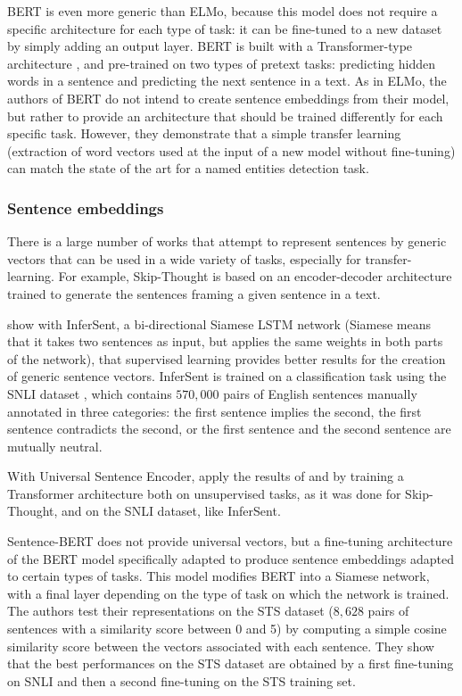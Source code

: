 BERT \cite{devlin2018bert} is even more generic than ELMo, because this model does not require a specific architecture for each type of task: it can be fine-tuned to a new dataset by simply adding an output layer. BERT is built with a Transformer-type architecture \cite{vaswani2017attention}, and pre-trained on two types of pretext tasks: predicting hidden words in a sentence and predicting the next sentence in a text. As in ELMo, the authors of BERT do not intend to create sentence embeddings from their model, but rather to provide an architecture that should be trained differently for each specific task. However, they demonstrate that a simple transfer learning (extraction of  word vectors used at the input of a new model without fine-tuning) can match the state of the art for a named entities detection task.

\subsubsection{Sentence embeddings}
\label{embedding_phrases}
There is a large number of works that attempt to represent sentences by generic vectors that can be used in a wide variety of tasks, especially for transfer-learning. 
For example, Skip-Thought \citep{kiros2015skip} is based on an encoder-decoder architecture trained to generate the sentences framing a given sentence in a text.

\citet{conneau2017supervised} show with InferSent, a bi-directional Siamese LSTM network (Siamese means that it takes two sentences as input, but applies the same weights in both parts of the network), that supervised learning provides better results for the creation of generic sentence vectors. InferSent is trained on a classification task using the SNLI dataset \cite{bowman2015large}, which contains $570,000$ pairs of English sentences manually annotated in three categories: the first sentence implies the second, the first sentence contradicts the second, or the first sentence and the second sentence are mutually neutral.

With Universal Sentence Encoder, \citet{cer2018universal} apply the results of \citet{kiros2015skip} and \citet{conneau2017supervised} by training a Transformer architecture both on unsupervised tasks, as it was done for Skip-Thought, and on the SNLI dataset, like InferSent. 

Sentence-BERT \cite{reimers_2019_sentence} does not provide universal vectors, but a fine-tuning architecture of the BERT model specifically adapted to produce sentence embeddings adapted to certain types of tasks. This model modifies BERT into a Siamese network, with a final layer depending on the type of task on which the network is trained. The authors test their representations on the STS dataset \cite{cer2017semeval} ($8,628$ pairs of sentences with a similarity score between 0 and 5) by computing a simple cosine similarity score between the vectors associated with each sentence. They show that the best performances on the STS dataset are obtained by a first fine-tuning on SNLI and then a second fine-tuning on the STS training set.

